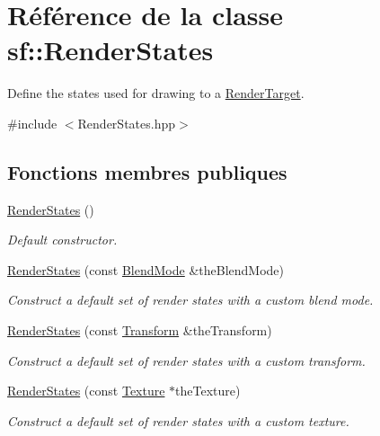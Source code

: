 \hypertarget{classsf_1_1RenderStates}{}\section{Référence de la classe sf\+:\+:Render\+States}
\label{classsf_1_1RenderStates}


Define the states used for drawing to a \hyperlink{classsf_1_1RenderTarget}{Render\+Target}.  




{\ttfamily \#include $<$Render\+States.\+hpp$>$}

\subsection*{Fonctions membres publiques}
\begin{DoxyCompactItemize}
\item 
\hyperlink{classsf_1_1RenderStates_a885bf14070d0d5391f062f62b270b7d0}{Render\+States} ()
\begin{DoxyCompactList}\small\item\em Default constructor. \end{DoxyCompactList}\item 
\hyperlink{classsf_1_1RenderStates_acac8830a593c8a4523ac2fdf3cac8a01}{Render\+States} (const \hyperlink{structsf_1_1BlendMode}{Blend\+Mode} \&the\+Blend\+Mode)
\begin{DoxyCompactList}\small\item\em Construct a default set of render states with a custom blend mode. \end{DoxyCompactList}\item 
\hyperlink{classsf_1_1RenderStates_a3e99cad6ab05971d40357949930ed890}{Render\+States} (const \hyperlink{classsf_1_1Transform}{Transform} \&the\+Transform)
\begin{DoxyCompactList}\small\item\em Construct a default set of render states with a custom transform. \end{DoxyCompactList}\item 
\hyperlink{classsf_1_1RenderStates_a8f4ca3be0e27dafea0c4ab8547439bb1}{Render\+States} (const \hyperlink{classsf_1_1Texture}{Texture} $\ast$the\+Texture)
\begin{DoxyCompactList}\small\item\em Construct a default set of render states with a custom texture. \end{DoxyCompactList}\item 

\end{DoxyCompactItemize}
